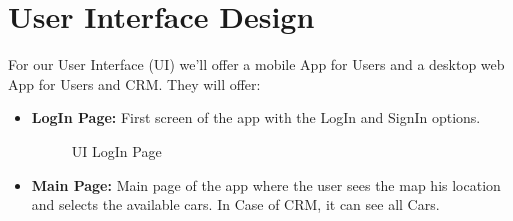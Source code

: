 \documentclass[a4paper]{article}
\begin{document}
\section{User Interface Design}
For our User Interface (UI) we'll offer a mobile App for Users and a desktop web App for Users and CRM. They will offer:
\begin {itemize}
\item \textbf{LogIn Page:} First screen of the app with the LogIn and SignIn options.
\begin{figure}[h]
\centering
\vspace*{\fill}
\noindent{}%
\caption {UI LogIn Page}
\vspace*{0.2cm}
\end{figure}
\pagebreak
\item \textbf{Main Page:} Main page of the app where the user sees the map his location and selects the available cars. In Case of CRM, it can see all Cars.
\begin{figure}[h]
\centering
\vspace*{\fill}
\noindent{}%

\end{figure}
\end{itemize}
\end{document}
